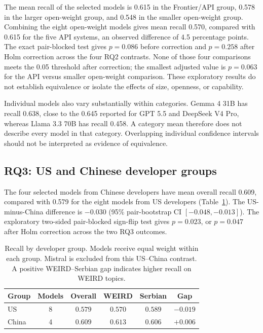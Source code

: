The mean recall of the selected models is 0.615 in the Frontier/API group,
0.578 in the larger open-weight group, and 0.548 in the smaller open-weight
group. Combining the eight open-weight models gives mean recall 0.570,
compared with 0.615 for the five API systems, an observed difference of
4.5 percentage points. The exact pair-blocked test gives $p=0.086$
before correction and $p=0.258$ after Holm correction across the four
RQ2 contrasts. None of those four comparisons meets the 0.05 threshold
after correction; the smallest adjusted value is $p=0.063$ for the API
versus smaller open-weight comparison. These exploratory results do not
establish equivalence or isolate the effects of size, openness, or capability.

Individual models also vary substantially within categories. Gemma 4 31B
has recall 0.638, close to the 0.645 reported for GPT 5.5 and DeepSeek
V4 Pro, whereas Llama 3.3 70B has recall 0.458. A category mean therefore
does not describe every model in that category. Overlapping individual
confidence intervals should not be interpreted as evidence of equivalence.

\subsection{RQ3: US and Chinese developer groups}
\label{sec:rq3}
The four selected models from Chinese developers have mean overall
recall 0.609, compared with 0.579 for the eight models from US developers
(Table~\ref{tab:origin-recall}). The US-minus-China difference is
$-0.030$ (95\% pair-bootstrap CI $[-0.048,-0.013]$). The exploratory
two-sided pair-blocked sign-flip test gives $p=0.023$, or $p=0.047$
after Holm correction across the two RQ3 outcomes.

\begin{table}[H]
\centering
\small
\caption{Recall by developer group. Models receive equal weight within
each group. Mistral is excluded from this US--China contrast. A positive
WEIRD--Serbian gap indicates higher recall on WEIRD topics.}
\label{tab:origin-recall}
\begin{tabular}{lccccc}
\toprule
Group & Models & Overall & WEIRD & Serbian & Gap\\
\midrule
US & 8 & $0.579$ & $0.570$ & $0.589$ & $-0.019$\\
China & 4 & $0.609$ & $0.613$ & $0.606$ & $+0.006$\\
\bottomrule
\end{tabular}
\end{table}

